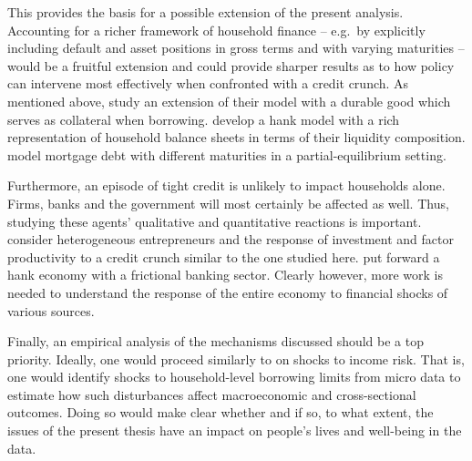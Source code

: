 \documentclass[a4paper,12pt]{article} %
\numberwithin{equation}{section} %
\numberwithin{figure}{section}
\numberwithin{table}{section}
\begin{document}
This provides the basis for a possible extension of the present analysis. Accounting for a richer framework of household finance -- e.g.~by explicitly including default and asset positions in gross terms and with varying maturities -- would be a fruitful extension and could provide sharper results as to how policy can intervene most effectively when confronted with a credit crunch. As mentioned above, \textcite{gl2017} study an extension of their model with a durable good which serves as collateral when borrowing. \textcite{kaplan2018} develop a \Gls{hank} model with a rich representation of household balance sheets in terms of their liquidity composition. \textcite{guerrieri2020} model mortgage debt with different maturities in a partial-equilibrium setting.

Furthermore, an episode of tight credit is unlikely to impact households alone. Firms, banks and the government will most certainly be affected as well. Thus, studying these agents' qualitative and quantitative reactions is important. \textcite{buera2020} consider heterogeneous entrepreneurs and the response of investment and factor productivity to a credit crunch similar to the one studied here. \textcite{lee2021} put forward a \Gls{hank} economy with a frictional banking sector. Clearly however, more work is needed to understand the response of the entire economy to financial shocks of various sources.

Finally, an empirical analysis of the mechanisms discussed should be a top priority. Ideally, one would proceed similarly to \textcite{bayer2019} on shocks to income risk. That is, one would identify shocks to household-level borrowing limits from micro data to estimate how such disturbances affect macroeconomic and cross-sectional outcomes. Doing so would make clear whether and if so, to what extent, the issues of the present thesis have an impact on people's lives and well-being in the data.

\newpage
\thispagestyle{plain}
\printbibliography[heading=bibintoc] %
\end{document}
